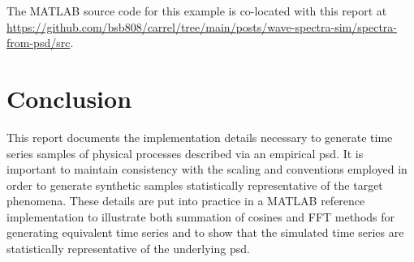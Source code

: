 \documentclass[journal]{IEEEtran}
\begin{document}
The MATLAB source code for this example is co-located with this report at \url{https://github.com/bsb808/carrel/tree/main/posts/wave-spectra-sim/spectra-from-psd/src}.


\section{Conclusion}
This report documents the implementation details necessary to generate time series samples of physical processes described via an empirical \ac{psd}. It is important to maintain consistency with the scaling and conventions employed in order to generate synthetic samples statistically representative of the target phenomena.  These details are put into practice in a MATLAB reference implementation to illustrate both summation of cosines and FFT methods for generating equivalent time series and to show that the simulated time series are statistically representative of the underlying \ac{psd}.




\end{document}
